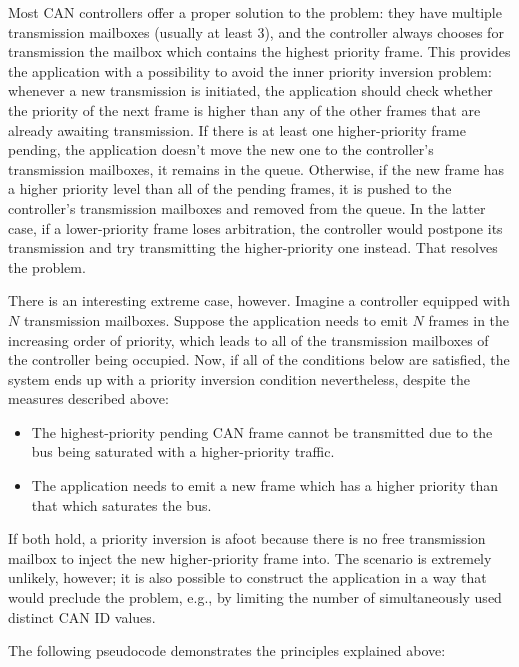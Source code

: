 Most CAN controllers offer a proper solution to the problem:
they have multiple transmission mailboxes (usually at least 3),
and the controller always chooses for transmission the mailbox which contains the highest priority frame.
This provides the application with a possibility to avoid the inner priority inversion problem:
whenever a new transmission is initiated, the application should check whether the priority of the next frame
is higher than any of the other frames that are already awaiting transmission.
If there is at least one higher-priority frame pending,
the application doesn't move the new one to the controller's transmission mailboxes,
it remains in the queue.
Otherwise, if the new frame has a higher priority level than all of the pending frames,
it is pushed to the controller's transmission mailboxes and removed from the queue.
In the latter case, if a lower-priority frame loses arbitration,
the controller would postpone its transmission and try transmitting the higher-priority one instead.
That resolves the problem.

There is an interesting extreme case, however.
Imagine a controller equipped with $N$ transmission mailboxes.
Suppose the application needs to emit $N$ frames in the increasing order of priority,
which leads to all of the transmission mailboxes of the controller being occupied.
Now, if all of the conditions below are satisfied, the system ends up with a priority inversion condition nevertheless,
despite the measures described above:

\begin{itemize}
    \item The highest-priority pending CAN frame cannot be transmitted due to the bus being saturated
    with a higher-priority traffic.
    \item The application needs to emit a new frame which has a higher priority than that which saturates the bus.
\end{itemize}

If both hold, a priority inversion is afoot because there is no free transmission mailbox to
inject the new higher-priority frame into.
The scenario is extremely unlikely, however;
it is also possible to construct the application in a way that would preclude the problem,
e.g., by limiting the number of simultaneously used distinct CAN ID values.

The following pseudocode demonstrates the principles explained above:

